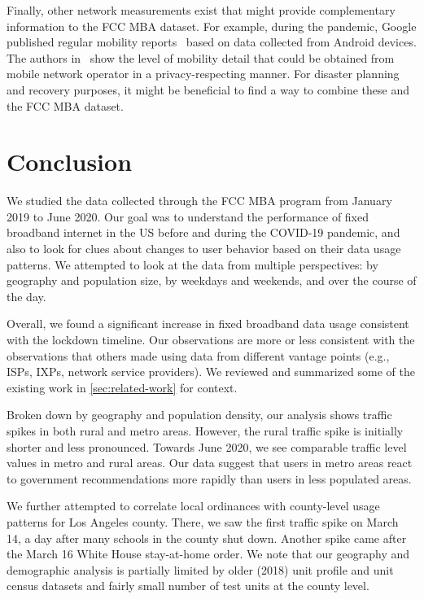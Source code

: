 \documentclass[conference,10pt]{IEEEtran}
\begin{document}

Finally, other network measurements exist that might provide complementary information to the \gls{FCC} \gls{MBA} dataset. For example, during the pandemic, Google published regular mobility reports~\cite{google-mobility-report} based on data collected from Android devices. The authors in~\cite{lutu2020characterization} show the level of mobility detail that could be obtained from mobile network operator in a privacy-respecting manner. For disaster planning and recovery purposes, it might be beneficial to find a way to combine these and the \gls{FCC} \gls{MBA} dataset.

\section{Conclusion}\label{sec:conclusion}

We studied the data collected through the \gls{FCC} \gls{MBA} program from January 2019 to June 2020. Our goal was to understand the performance of fixed broadband internet in the \gls{US} before and during the COVID-19 pandemic, and also to look for clues about changes to user behavior based on their data usage patterns. We attempted to look at the data from multiple perspectives: by geography and population size, by weekdays and weekends, and over the course of the day.

Overall, we found a significant increase in fixed broadband data usage consistent with the lockdown timeline. Our observations are more or less consistent with the observations that others made using data from different vantage points (e.g., \glspl{ISP}, \glspl{IXP}, network service providers). We reviewed and summarized some of the existing work in \cref{sec:related-work} for context.

Broken down by geography and population density, our analysis shows traffic spikes in both rural and metro areas. However, the rural traffic spike is initially shorter and less pronounced. Towards June 2020, we see comparable traffic level values in metro and rural areas. Our data suggest that users in metro areas react to government recommendations more rapidly than users in less populated areas.

We further attempted to correlate local ordinances with county-level usage patterns for Los Angeles county. There, we saw the first traffic spike on March 14, a day after many schools in the county shut down. Another spike came after the March 16 White House stay-at-home order. We note that our geography and demographic analysis is partially limited by older (2018) unit profile and unit census datasets and fairly small number of test units at the county level.
\end{document}
